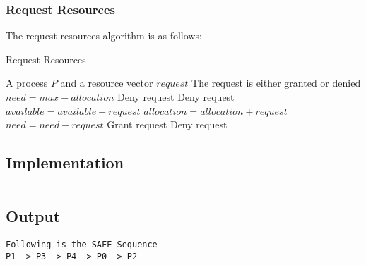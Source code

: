 \pagebreak
\subsubsection{Request Resources}

The request resources algorithm is as follows:

\begin{algorithm}
	\caption{Request Resources}
	\label{alg:request_resources}
	\begin{algorithmic}
		\Require A process $P$ and a resource vector $request$
		\Ensure The request is either granted or denied
		\State $need = max - allocation$
		\State Deny request
		\Else
		\State Deny request
		\Else
		\State $available = available - request$
		\State $allocation = allocation + request$
		\State $need = need - request$
		\State Grant request
		\Else
		\State Deny request
		\EndIf
		\EndIf
		\EndIf
	\end{algorithmic}
\end{algorithm}

\subsection{Implementation}

\inputminted[fontsize=\footnotesize,autogobble]{c}{code/bankers.c}

\subsection{Output}
\begin{lstlisting}[style=output]
Following is the SAFE Sequence
P1 -> P3 -> P4 -> P0 -> P2
\end{lstlisting}
